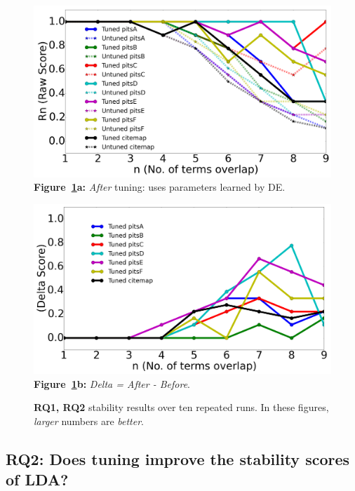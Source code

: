 \documentclass[twocolumn,5p,sort&compress]{elsarticle}
\theoremstyle{break}
\begin{document}
\begin{figure}[!htbp]
    \centering
    \begin{minipage}{.51\textwidth}
        \begin{center}
        \includegraphics[width=\linewidth]{./fig/raw_graph.png}
  {\bf Figure~\ref{fig:delta}a:}  {\em After} tuning: uses parameters learned by DE.
  \end{center}
    \end{minipage}%
    \begin{minipage}{.5\textwidth}
        \begin{center}
        \includegraphics[width=\linewidth]{./fig/tuned_delta_vem.png}
  {\bf Figure~\ref{fig:delta}b:}  {\em Delta = After - Before}.
  \end{center}
    \end{minipage}
    \caption{{\bf RQ1, RQ2} stability results over ten repeated runs. In these figures, {\em larger} numbers
    are {\em better}.}\label{fig:delta}
\end{figure}

\subsection{\textbf{RQ2: Does tuning improve the stability scores of LDA?}}\label{sect:stable}
\end{document}
